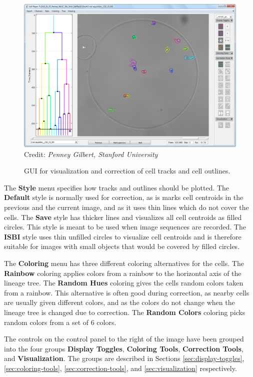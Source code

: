 \documentclass[a4paper, oneside, onecolumn, 11pt]{article}
\newcommand{\menu}[1]{\textbf{#1}}
\newcommand{\control}[1]{\textbf{#1}}
\newcommand{\credit}[1]{\raggedleft \scriptsize Credit:\emph{ #1}}
\begin{document}
\begin{figure}[!htb]
\begin{center}
\includegraphics[width = \columnwidth]{figures/correctionGUI}
\credit{Penney Gilbert, Stanford University}
\caption{GUI for visualization and correction of cell tracks and cell outlines.}
\label{fig:correction-GUI}
\end{center}
\end{figure}

The \menu{Style} menu specifies how tracks and outlines should be plotted. The \menu{Default} style is normally used for correction, as is marks cell centroids in the previous and the current image, and as it uses thin lines which do not cover the cells. The \menu{Save} style has thicker lines and visualizes all cell centroids as filled circles. This style is meant to be used when image sequences are recorded. The \menu{ISBI} style uses thin unfilled circles to visualize cell centroids and is therefore suitable for images with small objects that would be covered by filled circles.

The \menu{Coloring} menu has three different coloring alternatives for the cells. The \menu{Rainbow} coloring applies colors from a rainbow to the horizontal axis of the lineage tree. The \menu{Random Hues} coloring gives the cells random colors taken from a rainbow. This alternative is often good during correction, as nearby cells are usually given different colors, and as the colors do not change when the lineage tree is changed due to correction. The \menu{Random Colors} coloring picks random colors from a set of 6 colors.

The controls on the control panel to the right of the image have been grouped into the four groups \control{Display Toggles}, \control{Coloring Tools}, \control{Correction Tools}, and \control{Visualization}. The groups are described in Sections \ref{sec:display-toggles}, \ref{sec:coloring-tools}, \ref{sec:correction-tools}, and \ref{sec:visualization} respectively.
\end{document}
